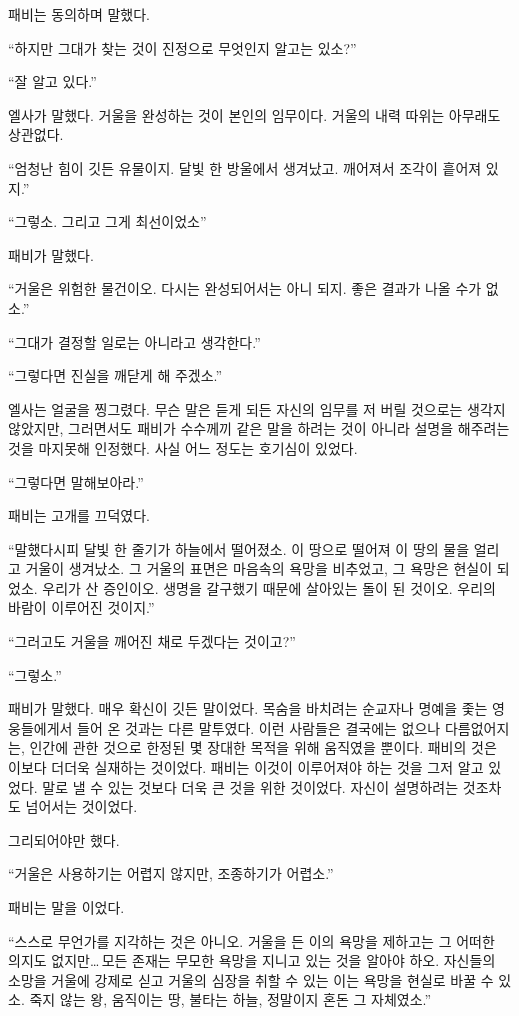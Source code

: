 패비는 동의하며 말했다.

``하지만 그대가 찾는 것이 진정으로 무엇인지 알고는 있소?''

``잘 알고 있다.''

엘사가 말했다. 거울을 완성하는 것이 본인의 임무이다. 거울의 내력 따위는 아무래도 상관없다.

``엄청난 힘이 깃든 유물이지. 달빛 한 방울에서 생겨났고. 깨어져서 조각이 흩어져 있지.''

``그렇소. 그리고 그게 최선이었소''

패비가 말했다.

``거울은 위험한 물건이오. 다시는 완성되어서는 아니 되지. 좋은 결과가 나올 수가 없소.''

``그대가 결정할 일로는 아니라고 생각한다.''

``그렇다면 진실을 깨닫게 해 주겠소.''

엘사는 얼굴을 찡그렸다. 무슨 말은 듣게 되든 자신의 임무를 저 버릴 것으로는 생각지 않았지만, 그러면서도 패비가 수수께끼 같은 말을 하려는 것이 아니라 설명을 해주려는 것을 마지못해 인정했다. 사실 어느 정도는 호기심이 있었다.

``그렇다면 말해보아라.''

패비는 고개를 끄덕였다.

``말했다시피 달빛 한 줄기가 하늘에서 떨어졌소. 이 땅으로 떨어져 이 땅의 물을 얼리고 거울이 생겨났소. 그 거울의 표면은 마음속의 욕망을 비추었고, 그 욕망은 현실이 되었소. 우리가 산 증인이오. 생명을 갈구했기 때문에 살아있는 돌이 된 것이오. 우리의 바람이 이루어진 것이지.''

``그러고도 거울을 깨어진 채로 두겠다는 것이고?''

``그렇소.''

패비가 말했다. 매우 확신이 깃든 말이었다. 목숨을 바치려는 순교자나 명예을 좇는 영웅들에게서 들어 온 것과는 다른 말투였다. 이런 사람들은 결국에는 없으나 다름없어지는, 인간에 관한 것으로 한정된 몇 장대한 목적을 위해 움직였을 뿐이다. 패비의 것은 이보다 더더욱 실재하는 것이었다. 패비는 이것이 이루어져야 하는 것을 그저 알고 있었다. 말로 낼 수 있는 것보다 더욱 큰 것을 위한 것이었다. 자신이 설명하려는 것조차도 넘어서는 것이었다.

그리되어야만 했다.

``거울은 사용하기는 어렵지 않지만, 조종하기가 어렵소.''

패비는 말을 이었다.

``스스로 무언가를 지각하는 것은 아니오. 거울을 든 이의 욕망을 제하고는 그 어떠한 의지도 없지만\ldots\,모든 존재는 무모한 욕망을 지니고 있는 것을 알아야 하오. 자신들의 소망을 거울에 강제로 싣고 거울의 심장을 취할 수 있는 이는 욕망을 현실로 바꿀 수 있소. 죽지 않는 왕, 움직이는 땅, 불타는 하늘, 정말이지 혼돈 그 자체였소.''

